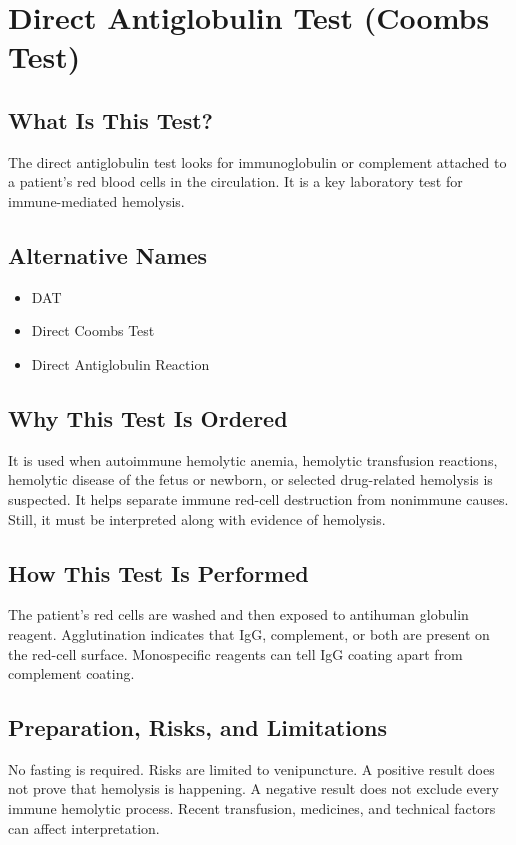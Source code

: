 \chapter{Direct Antiglobulin Test (Coombs Test)}

\section*{What Is This Test?}
The direct antiglobulin test looks for immunoglobulin or complement attached to a patient's red blood cells in the circulation. It is a key laboratory test for immune-mediated hemolysis.

\section*{Alternative Names}
\begin{itemize}
  \item DAT
  \item Direct Coombs Test
  \item Direct Antiglobulin Reaction
\end{itemize}
\section*{Why This Test Is Ordered}
It is used when autoimmune hemolytic anemia, hemolytic transfusion reactions, hemolytic disease of the fetus or newborn, or selected drug-related hemolysis is suspected. It helps separate immune red-cell destruction from nonimmune causes. Still, it must be interpreted along with evidence of hemolysis.

\section*{How This Test Is Performed}
The patient's red cells are washed and then exposed to antihuman globulin reagent. Agglutination indicates that IgG, complement, or both are present on the red-cell surface. Monospecific reagents can tell IgG coating apart from complement coating.

\section*{Preparation, Risks, and Limitations}
No fasting is required. Risks are limited to venipuncture. A positive result does not prove that hemolysis is happening. A negative result does not exclude every immune hemolytic process. Recent transfusion, medicines, and technical factors can affect interpretation.


